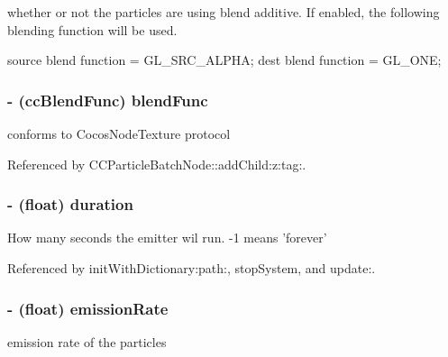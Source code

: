 whether or not the particles are using blend additive. If enabled, the following blending function will be used. 
\begin{DoxyCode}
        source blend function = GL_SRC_ALPHA;
        dest blend function = GL_ONE;
\end{DoxyCode}
 \hypertarget{interface_c_c_particle_system_a8393dacf0b2edf14e0e0561f34250d9d}{
\subsubsection[{blend\-Func}]{\setlength{\rightskip}{0pt plus 5cm}-\/ ({\bf cc\-Blend\-Func}) {\bf blend\-Func}}}\label{interface_c_c_particle_system_a8393dacf0b2edf14e0e0561f34250d9d}
conforms to Cocos\-Node\-Texture protocol 

Referenced by C\-C\-Particle\-Batch\-Node\-::add\-Child\-:z\-:tag\-:.

\hypertarget{interface_c_c_particle_system_ac76aed37427e5700bfe0f6c8956cd2c7}{
\subsubsection[{duration}]{\setlength{\rightskip}{0pt plus 5cm}-\/ (float) {\bf duration}}}\label{interface_c_c_particle_system_ac76aed37427e5700bfe0f6c8956cd2c7}
How many seconds the emitter wil run. -\/1 means 'forever' 

Referenced by init\-With\-Dictionary\-:path\-:, stop\-System, and update\-:.

\hypertarget{interface_c_c_particle_system_a35e7bf6e8ed7764949dff7268c809bb1}{
\subsubsection[{emission\-Rate}]{\setlength{\rightskip}{0pt plus 5cm}-\/ (float) {\bf emission\-Rate}}}\label{interface_c_c_particle_system_a35e7bf6e8ed7764949dff7268c809bb1}
emission rate of the particles 

